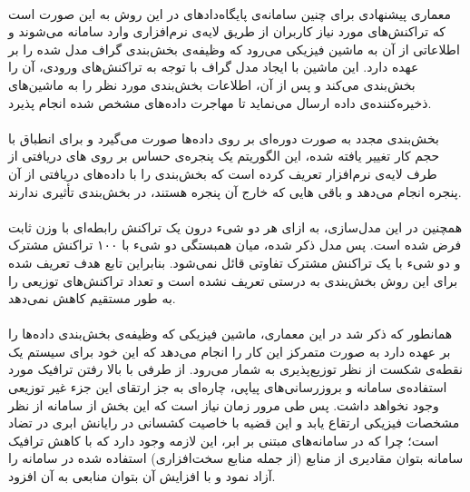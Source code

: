 \paragraph*{}
معماری پیشنهادی برای چنین سامانه‌ی پایگاه‌دادهای در این روش به این صورت است که تراکنش‌های مورد نیاز کاربران از طریق لایه‌ی نرم‌افزاری
وارد سامانه می‌شوند و اطلاعاتی از آن به ماشین فیزیکی می‌رود که وظیفه‌ی بخش‌بندی گراف مدل شده را بر عهده دارد. این ماشین با ایجاد مدل گراف با توجه به تراکنش‌های ورودی، آن را بخش‌بندی می‌کند و پس از آن، اطلاعات بخش‌بندی مورد نظر را به ماشین‌های ذخیره‌کننده‌ی داده ارسال می‌نماید تا مهاجرت داده‌های مشخص شده انجام پذیرد.

\paragraph*{}
بخش‌بندی مجدد به صورت دوره‌ای بر روی داده‌ها صورت می‌گیرد و برای انطباق با حجم کار تغییر یافته شده، این الگوریتم یک پنجره‌ی حساس
بر روی
های
دریافتی از طرف لایه‌ی نرم‌افزار تعریف کرده است که بخش‌بندی را با داده‌های دریافتی از آن پنجره انجام می‌دهد و باقی
هایی
که خارج آن پنجره هستند، در بخش‌بندی تأثیری ندارند.

\paragraph*{}
همچنین در این مدل‌سازی، به ازای هر دو شیء درون یک تراکنش رابطه‌ای با وزن ثابت فرض شده است. پس مدل ذکر شده، میان همبستگی دو شیء با ۱۰۰ تراکنش مشترک و دو شیء با یک تراکنش مشترک تفاوتی قائل نمی‌شود. بنابراین تابع هدف تعریف شده برای این روش بخش‌بندی به درستی تعریف نشده است و تعداد تراکنش‌های توزیعی را به طور مستقیم کاهش نمی‌دهد.

\paragraph*{}
همانطور که ذکر شد در این معماری، ماشین فیزیکی که وظیفه‌ی بخش‌بندی داده‌ها را بر عهده دارد به صورت متمرکز این کار را انجام می‌دهد که این خود برای سیستم یک نقطه‌ی شکست
از نظر توزیع‌پذیری به شمار می‌رود. از طرفی با بالا رفتن ترافیک مورد استفاده‌ی سامانه و بروزرسانی‌های پیاپی، چاره‌ای به جز ارتقای این جزء غیر توزیعی وجود نخواهد داشت. پس طی مرور زمان نیاز است که این بخش از سامانه از نظر مشخصات فیزیکی ارتقاع یابد و این قضیه با خاصیت کشسانی در رایانش ابری در تضاد است؛ چرا که در سامانه‌های مبتنی بر ابر، این لازمه وجود دارد که با کاهش ترافیک سامانه بتوان مقادیری از منابع (از جمله منابع سخت‌افزاری) استفاده شده در سامانه را آزاد نمود و با افزایش آن بتوان منابعی به آن افزود.

